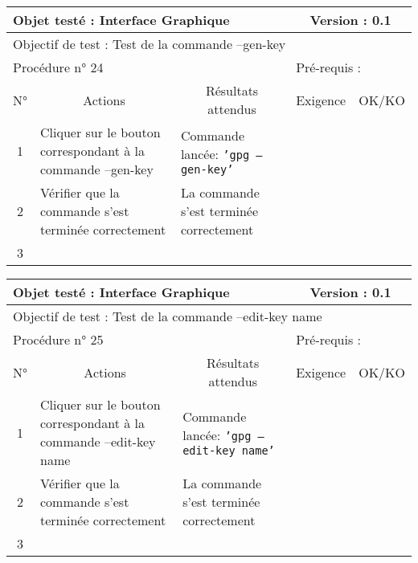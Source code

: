 \documentclass{../res/univ-projet}
\begin{document}
\begin{center}
\begin{tabular}{|c|p{5cm}|p{5cm}|p{1.5cm}|p{1.5cm}|}
\hline
\multicolumn{3}{|l|}{Objet testé : Interface Graphique} & \multicolumn{2}{c|}{Version : 0.1}\\ \hline
\multicolumn{5}{|l|}{Objectif de test : Test de la commande –gen-key}\\ \hline
\multicolumn{3}{|l|}{Procédure n° 24} & \multicolumn{2}{p{3cm}|}{Pré-requis : }\\ \hline
\multicolumn{1}{|c|}{N°} & \multicolumn{1}{c|}{Actions} & \multicolumn{1}{c|}{Résultats attendus} & 
\multicolumn{1}{c|}{Exigence} & \multicolumn{1}{c|}{OK/KO}\\ \hline
1 & Cliquer sur le bouton correspondant à la commande –gen-key & Commande lancée: \texttt{'gpg –gen-key'} &  & \\
2 & Vérifier que la commande s'est terminée correctement & La commande s'est terminée correctement &  & \\
3 &  &  &  & \\ \hline
\end{tabular}
\vskip 2.2cm


\begin{tabular}{|c|p{5cm}|p{5cm}|p{1.5cm}|p{1.5cm}|}
\hline
\multicolumn{3}{|l|}{Objet testé : Interface Graphique} & \multicolumn{2}{c|}{Version : 0.1}\\ \hline
\multicolumn{5}{|l|}{Objectif de test : Test de la commande –edit-key name}\\ \hline
\multicolumn{3}{|l|}{Procédure n° 25} & \multicolumn{2}{p{3cm}|}{Pré-requis : }\\ \hline
\multicolumn{1}{|c|}{N°} & \multicolumn{1}{c|}{Actions} & \multicolumn{1}{c|}{Résultats attendus} & 
\multicolumn{1}{c|}{Exigence} & \multicolumn{1}{c|}{OK/KO}\\ \hline
1 & Cliquer sur le bouton correspondant à la commande –edit-key name & Commande lancée: \texttt{'gpg –edit-key name'} &  & \\
2 & Vérifier que la commande s'est terminée correctement & La commande s'est terminée correctement &  & \\
3 &  &  &  & \\ \hline
\end{tabular}
\vskip 2.2cm



\end{center}
\end{document}
